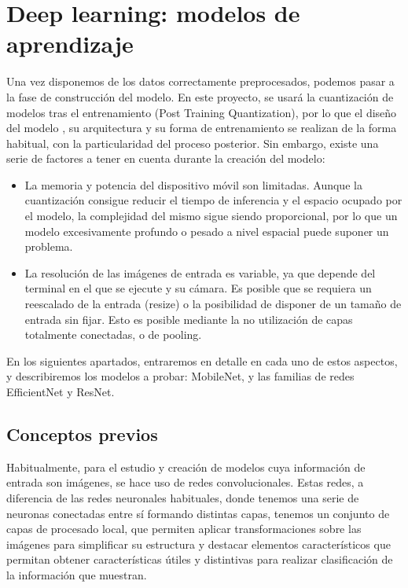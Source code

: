 \chapter{Deep learning: modelos de aprendizaje}

Una vez disponemos de los datos correctamente preprocesados, podemos pasar a la fase de construcción del modelo. En este proyecto, se usará la cuantización de modelos tras el entrenamiento (Post Training Quantization), por lo que el diseño del modelo , su arquitectura y su forma de entrenamiento se realizan de la forma habitual, con la particularidad del proceso posterior. Sin embargo, existe una serie de factores a tener en cuenta durante la creación del modelo:

\begin{itemize}
	\item La memoria y potencia del dispositivo móvil son limitadas. Aunque la cuantización consigue reducir el tiempo de inferencia y el espacio ocupado por el modelo, la complejidad del mismo sigue siendo proporcional, por lo que un modelo excesivamente profundo o pesado a nivel espacial puede suponer un problema.
	\item La resolución de las imágenes de entrada es variable, ya que depende del terminal en el que se ejecute y su cámara. Es posible que se requiera un reescalado de la entrada (resize) o la posibilidad de disponer de un tamaño de entrada sin fijar. Esto es posible mediante la no utilización de capas totalmente conectadas, o de pooling.
\end{itemize}

En los siguientes apartados, entraremos en detalle en cada uno de estos aspectos, y describiremos los modelos a probar: MobileNet, y las familias de redes EfficientNet y ResNet.

\section{Conceptos previos}

Habitualmente, para el estudio y creación de modelos cuya información de entrada son imágenes, se hace uso de redes convolucionales. Estas redes, a diferencia de las redes neuronales habituales, donde tenemos una serie de neuronas conectadas entre sí formando distintas capas,  tenemos un conjunto de capas de procesado local, que permiten aplicar transformaciones sobre las imágenes para simplificar su estructura y destacar elementos característicos que permitan obtener características útiles y distintivas para realizar clasificación de la información que muestran.

